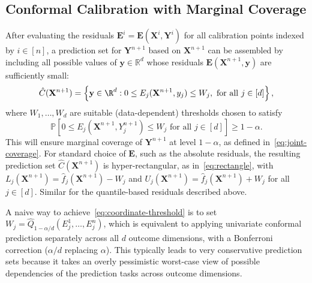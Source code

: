 \subsection{Conformal Calibration with Marginal Coverage}\label{sec:calibration}

After evaluating the residuals $\mathbf{E}^i = \mathbf E(\mathbf X^i, \mathbf Y^i)$ for all calibration points indexed by $i \in [n]$, a prediction set for $\mathbf{Y}^{n+1}$ based on $\mathbf{X}^{n+1}$ can be assembled by including all possible values of $\mathbf y \in \mathbb{R}^d$ whose residuals $\mathbf E(\mathbf{X}^{n+1}, \mathbf y)$ are sufficiently small:
\begin{equation}
    \hat{C}(\mathbf{X}^{n+1}) = \left\{\mathbf y \in \R^d: 0\leq E_j(\mathbf{X}^{n+1},y_j) \leq W_j, \text{ for all } j \in [d] \right\},
    \label{eq:joint-prediction}
\end{equation}
{\color{blue}where $W_1,\ldots,W_d$ are suitable (data-dependent) thresholds chosen to satisfy
\begin{equation}
    \mathbb{P} \left[0\leq E_j(\mathbf{X}^{n+1}, {Y}^{n+1}_j) \leq W_j \text{ for all } j \in [d] \right] \geq 1-\alpha.
    \label{eq:coordinate-threshold}
\end{equation}
This will ensure marginal coverage of $\mathbf{Y}^{n+1}$ at level $1-\alpha$, as defined in~\eqref{eq:joint-coverage}. For standard choice of $\mathbf E$, such as the absolute residuals, the resulting prediction set $\hat{C}(\mathbf{X}^{n+1})$ is hyper-rectangular, as in~\eqref{eq:rectangle}, with $L_j(\mathbf{X}^{n+1}) = \hat{f}_j(\mathbf{X}^{n+1}) - W_j$ and $U_j(\mathbf{X}^{n+1}) = \hat{f}_j(\mathbf{X}^{n+1}) + W_j$ for all $j \in [d]$. Similar for the quantile-based residuals described above.}

A naive way to achieve~\eqref{eq:coordinate-threshold} is to set $W_j = \hat{Q}_{1-\alpha/d}({E}^1_j, \ldots ,E^n_j)$, which is equivalent to applying univariate conformal prediction separately across all $d$ outcome dimensions, with a Bonferroni correction ($\alpha/d$ replacing $\alpha$).
This typically leads to very conservative prediction sets because it takes an overly pessimistic worst-case view of possible dependencies of the prediction tasks across outcome dimensions.


